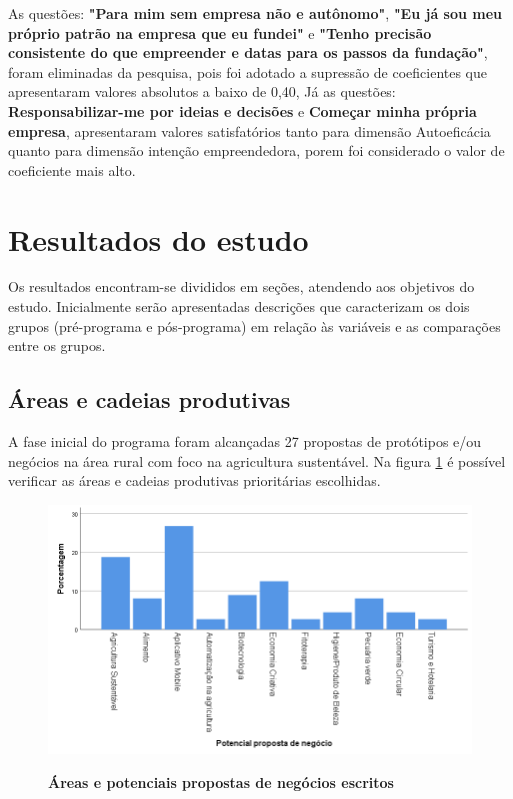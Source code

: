 As questões: \textbf{"Para mim sem empresa não e autônomo"}, \textbf{"Eu já sou meu próprio patrão na empresa que eu fundei"} e \textbf{"Tenho precisão consistente do que empreender e datas para os passos da fundação"}, foram eliminadas da pesquisa, pois foi adotado a supressão de coeficientes que apresentaram valores absolutos a baixo de 0,40, Já as questões: \textbf{Responsabilizar-me por ideias e decisões} e \textbf{Começar minha própria empresa}, apresentaram valores satisfatórios tanto para dimensão Autoeficácia quanto para dimensão intenção empreendedora, porem foi considerado o valor de coeficiente mais alto.


\section{Resultados do estudo}

Os resultados encontram-se divididos em seções, atendendo aos objetivos do estudo. Inicialmente  serão  apresentadas  descrições  que  caracterizam  os  dois  grupos  (pré-programa  e pós-programa) em relação às variáveis e as comparações entre os grupos.

\subsection{Áreas e cadeias produtivas}


A fase inicial do programa foram alcançadas 27 propostas de protótipos e/ou negócios na área rural com foco na agricultura sustentável. Na figura \ref{figura_11} é possível verificar as áreas e cadeias produtivas prioritárias escolhidas.


\begin{figure}[!H]
\centering
\caption{\textbf{Áreas e potenciais propostas de negócios escritos}}
\includegraphics[scale=0.5]{Imagens/propostas_negocios.png}
\label{figura_11}
\end{figure}

